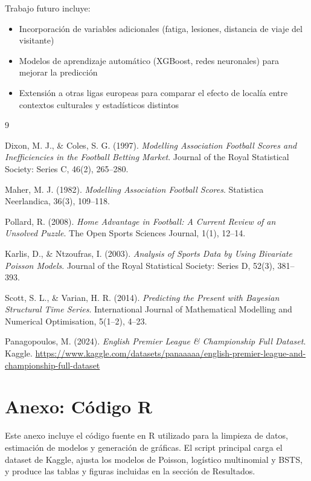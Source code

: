 \documentclass[a4paper,12pt]{article}
\begin{document}
Trabajo futuro incluye:
\begin{itemize}
    \item Incorporación de variables adicionales (fatiga, lesiones, distancia de viaje del visitante)
    \item Modelos de aprendizaje automático (XGBoost, redes neuronales) para mejorar la predicción
    \item Extensión a otras ligas europeas para comparar el efecto de localía entre contextos culturales y estadísticos distintos
\end{itemize}

\begin{thebibliography}{9}

Dixon, M. J., \& Coles, S. G. (1997).
\textit{Modelling Association Football Scores and Inefficiencies in the Football Betting Market}.
Journal of the Royal Statistical Society: Series C, 46(2), 265--280.

Maher, M. J. (1982).
\textit{Modelling Association Football Scores}.
Statistica Neerlandica, 36(3), 109--118.

Pollard, R. (2008).
\textit{Home Advantage in Football: A Current Review of an Unsolved Puzzle}.
The Open Sports Sciences Journal, 1(1), 12--14.

Karlis, D., \& Ntzoufras, I. (2003).
\textit{Analysis of Sports Data by Using Bivariate Poisson Models}.
Journal of the Royal Statistical Society: Series D, 52(3), 381--393.

Scott, S. L., \& Varian, H. R. (2014).
\textit{Predicting the Present with Bayesian Structural Time Series}.
International Journal of Mathematical Modelling and Numerical Optimisation, 5(1--2), 4--23.

Panagopoulos, M. (2024).
\textit{English Premier League \& Championship Full Dataset}.
Kaggle. \url{https://www.kaggle.com/datasets/panaaaaa/english-premier-league-and-championship-full-dataset}

\end{thebibliography}

\appendix
\section{Anexo: Código R}

Este anexo incluye el código fuente en R utilizado para la limpieza de datos, estimación de modelos y generación de gráficas. El script principal carga el dataset de Kaggle, ajusta los modelos de Poisson, logístico multinomial y BSTS, y produce las tablas y figuras incluidas en la sección de Resultados.
\end{document}
